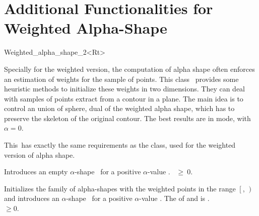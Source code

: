 

\section{Additional Functionalities for Weighted Alpha-Shape\label{I2_SectWeighted_Alpha_Shape_2}}

\ccChapterSubTitle{\alphashapeRevision, \alphashapeDate}

\begin{ccClassTemplate} {Weighted_alpha_shape_2<Rt>}

\ccDefinition
Specially for the weighted version, the computation of alpha shape often
enforces an estimation of weights for the sample of points. This class
\ccClassTemplateName\ provides some heuristic methods to initialize these
weights in two dimensions. They can deal with samples of points extract from a
contour in a plane. The main idea is to control an union of sphere, dual of the
weighted alpha shape, which has to preserve the skeleton of the original
contour. The best results are in  mode, with $\alpha=0$.


\ccInheritsFrom


This\ccClassTemplateName\ has exactly the same requirements as the
 class, used for the weighted version of alpha shape.

\ccCreation
{}

{Introduces an empty $\alpha$-shape \ccVar\ for a positive $\alpha$-value
 .
\ccPrecond {}~$\geq~0$.}


{Initializes the family of alpha-shapes with the weighted points in the range
$\left[\right.$, $\left.\right)$ and 
introduces an $\alpha$-shape \ccVar\ for a positive $\alpha$-value
.  
\ccPrecond The  of  and
 is .\\
 $\geq 0$.}


\end{ccClassTemplate}
